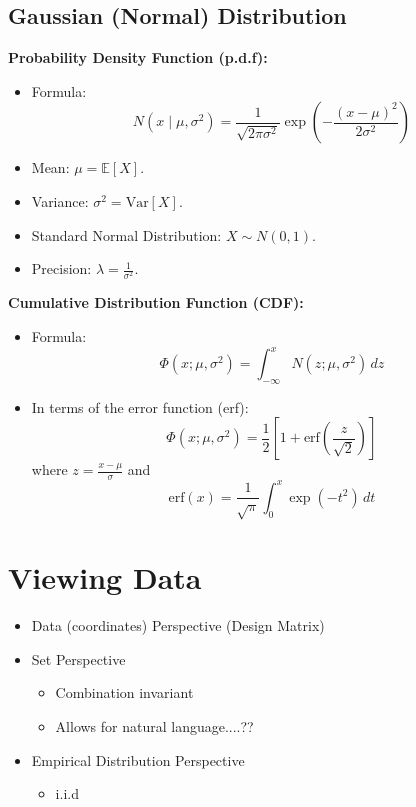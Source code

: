 \subsection{Gaussian (Normal) Distribution}
\textbf{Probability Density Function (p.d.f):}
\begin{itemize}
    \item Formula: \[
    N(x \mid \mu, \sigma^2) = \frac{1}{\sqrt{2\pi\sigma^2}} \exp\left(-\frac{(x - \mu)^2}{2\sigma^2}\right)
    \]
    \item Mean: \(\mu = \mathbb{E}[X]\).
    \item Variance: \(\sigma^2 = \text{Var}[X]\).
    \item Standard Normal Distribution: \(X \sim N(0, 1)\).
    \item Precision: \(\lambda = \frac{1}{\sigma^2}\).
\end{itemize}
\textbf{Cumulative Distribution Function (CDF):}
\begin{itemize}
    \item Formula: \[
    \Phi(x; \mu, \sigma^2) = \int_{-\infty}^x N(z; \mu, \sigma^2) \, dz
    \]
    \item In terms of the error function (erf):
        \[
        \Phi(x; \mu, \sigma^2) = \frac{1}{2} \left[1 + \text{erf}\left(\frac{z}{\sqrt{2}}\right)\right]
        \]
        where \(z = \frac{x - \mu}{\sigma}\) and
        \[
        \text{erf}(x) = \frac{1}{\sqrt{\pi}} \int_0^x \exp(-t^2) \, dt
        \]
\end{itemize}


\section{Viewing Data}

\begin{itemize}
    \item Data (coordinates) Perspective (Design Matrix) 
    \item Set Perspective
    \begin{itemize}
        \item Combination invariant
        \item Allows for natural language....??
    \end{itemize}
    \item Empirical Distribution Perspective
    \begin{itemize}
        \item i.i.d
    \end{itemize}
\end{itemize}


